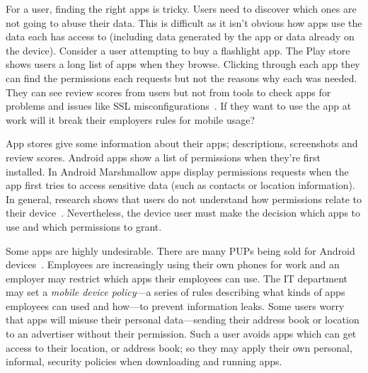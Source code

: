 \documentclass[thesis.tex]{subfiles}
\begin{document}
For a user, finding the right apps is tricky.  Users need to discover
which ones are not going to abuse their data.  This is difficult as it
isn't obvious how apps use the data each has access to (including data
generated by the app or data already on the device).  Consider a user
attempting to buy a flashlight app.  The Play store shows users a long
list of apps when they browse.  Clicking through each app they can
find the permissions each requests but not the reasons why each was
needed.  They can see review scores from users but not from tools to
check apps for problems and issues like SSL
misconfigurations~\cite{fahl_why_2012}.  If they want to use the app
at work will it break their employers rules for mobile usage?

App stores give some information about their apps; descriptions,
screenshots and review scores.  Android apps show a list of
permissions when they're first installed.  In Android Marshmallow apps
display permissions requests when the app first tries to access
sensitive data (such as contacts or location information).  In
general, research shows that users do not understand how permissions
relate to their device~\cite{felt_android_2012,thompson_when_2013}.
Nevertheless, the device user must make the decision which apps to use
and which permissions to grant.

Some apps are highly undesirable.  There are many \acp{PUP} being sold
for Android
devices~\cite{truong_company_2014,vanja_svajcer_classifying_2013}.
Employees are increasingly using their own phones for work and an
employer may restrict which apps their employees can use.  The IT
department may set a \emph{mobile device policy}---a series of rules
describing what kinds of apps employees can used and how---to prevent
information leaks.  Some users worry that apps will misuse their
personal data---sending their address book or location to an
advertiser without their permission.  Such a user avoids apps which
can get access to their location, or address book; so they may apply their own
personal, informal, security policies when downloading and running apps.
\end{document}
